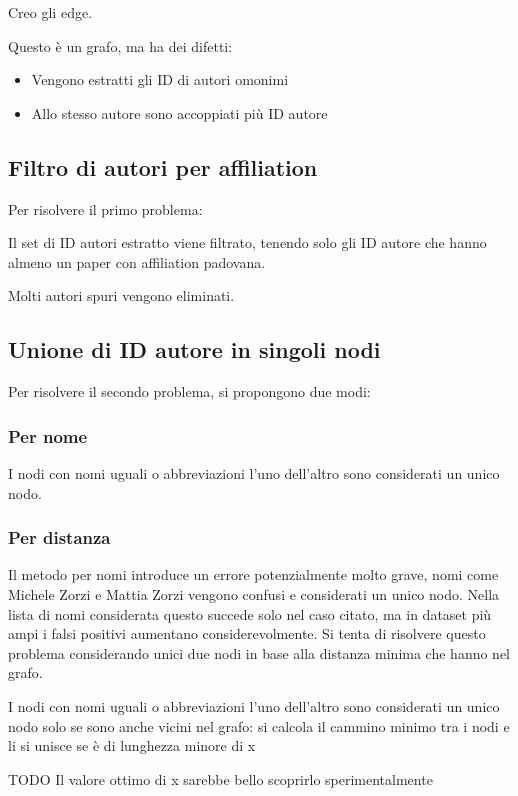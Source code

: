 \documentclass[12pt,a4paper,twoside]{report}
\begin{document}
Creo gli edge.

Questo è un grafo, ma ha dei difetti:
\begin{itemize}[noitemsep, topsep=0pt]
\item
Vengono estratti gli ID di autori omonimi
\item
Allo stesso autore sono accoppiati più ID autore
\end{itemize}

\subsection{Filtro di autori per affiliation} \label{ssc:padovani}
Per risolvere il primo problema:

Il set di ID autori estratto viene filtrato, tenendo solo gli ID autore che hanno almeno un paper con affiliation padovana.

Molti autori spuri vengono eliminati.

\subsection{Unione di ID autore in singoli nodi} \label{ssc:collassa}
Per risolvere il secondo problema, si propongono due modi:
\subsubsection{Per nome} \label{ssc:nomi}
I nodi con nomi uguali o abbreviazioni l'uno dell'altro sono considerati un unico nodo.


\subsubsection{Per distanza} \label{ssc:nomi}
Il metodo per nomi
introduce un errore potenzialmente molto grave, nomi come Michele Zorzi e Mattia Zorzi vengono confusi e considerati un unico nodo. Nella lista di nomi considerata questo succede solo nel caso citato, ma in dataset più ampi i falsi positivi aumentano considerevolmente. Si tenta di risolvere questo problema considerando unici due nodi in base alla distanza minima che hanno nel grafo.

I nodi con nomi uguali o abbreviazioni l'uno dell'altro sono considerati un unico nodo solo se sono anche vicini nel grafo: si calcola il cammino minimo tra i nodi e li si unisce se è di lunghezza minore di x

TODO Il valore ottimo di x sarebbe bello scoprirlo sperimentalmente
\end{document}
